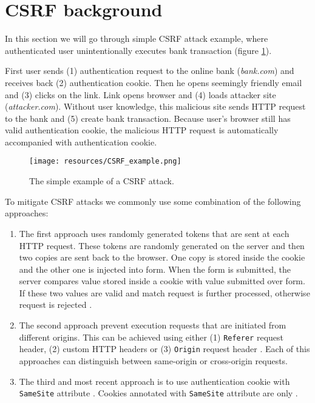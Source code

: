 \documentclass[journal,a4paper,twoside]{template/IEEEtran}
\begin{document}
\section{CSRF background}
\label{sec_csrfbackground}

In this section we will go through simple CSRF attack example, where authenticated user unintentionally executes bank transaction (figure \ref{img_simplecsrfattack}).

First user sends (1) authentication request to the online bank (\textit{bank.com}) and receives back (2) authentication cookie. Then he opens seemingly friendly email and (3) clicks on the link. Link opens browser and (4) loads attacker site (\textit{attacker.com}). Without user knowledge, this malicious site sends HTTP request to the bank and (5) create bank transaction. Because user's browser still has valid authentication cookie, the malicious HTTP request is automatically accompanied with authentication cookie.

\begin{figure}[htb]
\centerline{\texttt{[image: resources/CSRF\_example.png]}}
\caption{The simple example of a CSRF attack.}
\label{img_simplecsrfattack}
\end{figure}

To mitigate CSRF attacks we commonly use some combination of the following approaches:
\begin{enumerate}
    \item The first approach uses randomly generated tokens that are sent at each HTTP request. These tokens are randomly generated on the server and then two copies are sent back to the browser. One copy is stored inside the cookie and the other one is injected into form. When the form is submitted, the server compares value stored inside a cookie with value submitted over form. If these two values are valid and match request is further processed, otherwise request is rejected \cite{li2018mitigating}.
    \item The second approach prevent execution requests that are initiated from different origins. This can be achieved using either (1) \texttt{Referer} request header, (2) custom HTTP headers or (3) \texttt{Origin} request header \cite{barth2008robust,li2018mitigating}. Each of this approaches can distinguish between same-origin or cross-origin requests.
    \item The third and most recent approach \cite{owaspthefallofcsrf} is to use authentication cookie with \texttt{SameSite} attribute \cite{Goodwin2018Nov}. Cookies annotated with \texttt{SameSite} attribute are only   .
\end{enumerate}
\end{document}
